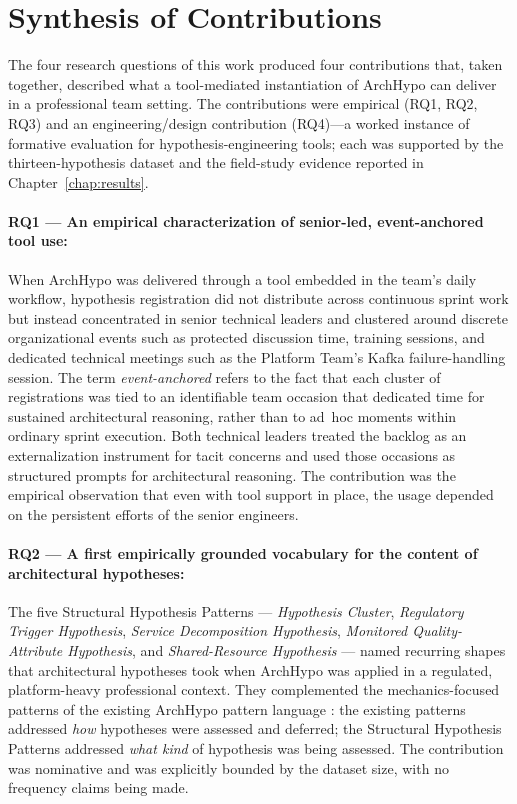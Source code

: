\section{Synthesis of Contributions}
\label{sec:conclusion-synthesis}

The four research questions of this work produced four contributions that,
taken together, described what a tool-mediated instantiation of ArchHypo can
deliver in a professional team setting. The contributions were empirical (RQ1, RQ2, RQ3) and an engineering/design contribution (RQ4)---a worked instance of formative evaluation for hypothesis-engineering tools; each
was supported by the thirteen-hypothesis dataset and the field-study evidence
reported in Chapter~\ref{chap:results}.

\paragraph{RQ1 --- An empirical characterization of senior-led,
event-anchored tool use:} When ArchHypo was delivered through a tool embedded
in the team's daily workflow, hypothesis registration did not distribute
across continuous sprint work but instead concentrated in senior technical
leaders and clustered around discrete organizational events such as protected
discussion time, training sessions, and dedicated technical meetings such as
the Platform Team's Kafka failure-handling session. The term \emph{event-anchored} 
refers to the fact that each cluster of registrations was tied to an
identifiable team occasion that dedicated time for sustained architectural reasoning,
rather than to ad~hoc moments within ordinary sprint execution. Both
technical leaders treated the backlog as an externalization instrument for
tacit concerns and used those occasions as structured prompts for
architectural reasoning. The contribution was the empirical observation that
even with tool support in place, the usage depended on the persistent efforts 
of the senior engineers.

\paragraph{RQ2 --- A first empirically grounded vocabulary for the content of
architectural hypotheses:} The five Structural Hypothesis Patterns --- \textit{Hypothesis
Cluster}, \textit{Regulatory Trigger Hypothesis}, \textit{Service Decomposition
Hypothesis}, \textit{Monitored Quality-Attribute Hypothesis}, and \textit{Shared-Resource
Hypothesis} --- named recurring shapes that architectural
hypotheses took when ArchHypo was applied in a regulated, platform-heavy
professional context. They complemented the mechanics-focused patterns of the
existing ArchHypo pattern language \citep{silva2024patterns}: the existing
patterns addressed \emph{how} hypotheses were assessed and deferred; the
Structural Hypothesis Patterns addressed \emph{what kind} of hypothesis was being
assessed. The contribution was nominative and was explicitly bounded by
the dataset size, with no frequency claims being made.

